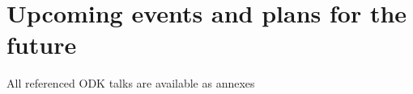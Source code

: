 \documentclass{../../Proposal/LaTeX-proposal/deliverablereport}
\begin{document}















\section{Upcoming events and plans for the future}




\footnotesize{All referenced ODK talks are available as annexes}
\end{document}
